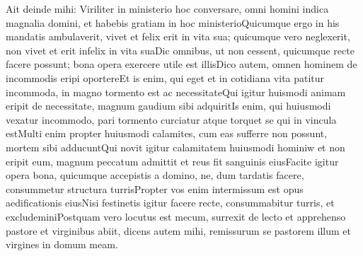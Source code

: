 Ait deinde mihi: Viriliter in ministerio hoc conversare, omni homini indica magnalia domini, et habebis gratiam in hoc ministerioQuicumque ergo in his mandatis ambulaverit, vivet et felix erit in vita sua; quicumque vero neglexerit, non vivet et erit infelix in vita suaDic omnibus, ut non cessent, quicumque recte facere possunt; bona opera exercere utile est illisDico autem, omnen hominem de incommodis eripi oportereEt is enim, qui eget et in cotidiana vita patitur incommoda, in magno tormento est ac necessitateQui igitur huismodi animam eripit de necessitate, magnum gaudium sibi adquiritIs enim, qui huiusmodi vexatur incommodo, pari tormento curciatur atque torquet se qui in vincula estMulti enim propter huiusmodi calamites, cum eas sufferre non possunt, mortem sibi adducuntQui novit igitur calamitatem huiusmodi hominiw et non eripit eum, magnum peccatum admittit et reus fit sanguinis eiusFacite igitur opera bona, quicumque accepistis a domino, ne, dum tardatis facere, consummetur structura turrisPropter vos enim intermissum est opus aedificationis eiusNisi festinetis igitur facere recte, consummabitur turris, et excludeminiPostquam vero locutus est mecum, surrexit de lecto et apprehenso pastore et virginibus abiit, dicens autem mihi, remissurum se pastorem illum et virgines in domum meam.
